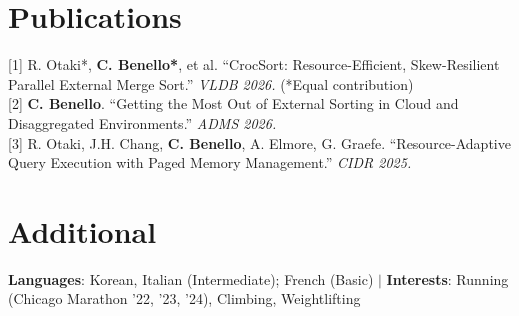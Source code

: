 \documentclass[letterpaper,10pt]{article}
\begin{document}
\section{Publications}
 \begin{itemize}[leftmargin=0.015in, label={}]
    \small{\item{
     {[1] R. Otaki*, \textbf{C. Benello*}, et al. ``CrocSort: Resource-Efficient, Skew-Resilient Parallel External Merge Sort.'' \textit{VLDB 2026.} (*Equal contribution)} \\
     {[2] \textbf{C. Benello}. ``Getting the Most Out of External Sorting in Cloud and Disaggregated Environments.'' \textit{ADMS 2026.}} \\
     {[3] R. Otaki, J.H. Chang, \textbf{C. Benello}, A. Elmore, G. Graefe. ``Resource-Adaptive Query Execution with Paged Memory Management.'' \textit{CIDR 2025.}}
    }}
 \end{itemize}\vspace{-9pt}

\section{Additional}
 \begin{itemize}[leftmargin=0.015in, label={}]
    \small{\item{
     \textbf{Languages}: Korean, Italian (Intermediate); French (Basic) $|$ \textbf{Interests}: Running (Chicago Marathon '22, '23, '24), Climbing, Weightlifting
    }}
 \end{itemize}
\end{document}
